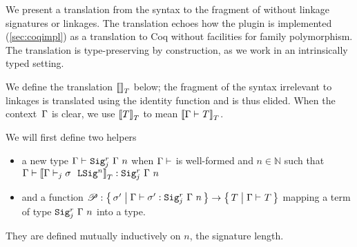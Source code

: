 We present a translation from the \TT syntax to the fragment of \TT without
linkage signatures or linkages.
The translation echoes how the \Lang plugin is implemented (\cref{sec:coqimpl})
as a translation to Coq without facilities for family polymorphism.
The translation is type-preserving by construction, as we work in an
intrinsically typed setting.

%
 


We define the translation $\denotesT{}$ below; the fragment of the syntax
irrelevant to linkages is translated using the identity function and is thus elided.
When the context~$\Gm$ is clear, we use $\denotesT{T}$ to mean $\denotesT{\goodType{\Gamma}{T}{}}$.

We will first define two helpers
\begin{itemize}
  \item a new type $\goodType{\Gamma}{\Sigr{\Gamma}{n}{j}}{}$  when
  $\goodCtx{\Gamma}{}$  is well-formed and $n \in \mathbb{N}$
  such that $\goodTerm{\Gm}{\denotesT{\goodSigU{j}{\Gamma}{\lsig}{n}}}{\Sigr{\Gm}{n}{j}}$
  \item and a function $\mathscr{P} : \setc{\lsig'}{ \goodTerm{\Gm}{\lsig'}{\Sigr{\Gm}{n}{j}} } \to \setc{T}{ \goodType{\Gm}{T}{} }$ mapping a term of type $\Sigr{\Gm}{n}{j}$ into a type.
\end{itemize}
They are defined mutually inductively on $n$, the signature length.

